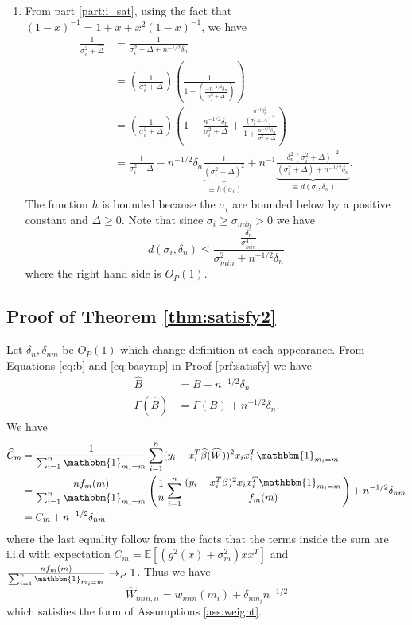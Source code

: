 \documentclass[ejs,ps,preprint]{imsart}
\numberwithin{equation}{section}
\theoremstyle{plain}
\newcommand{\E}{\mathbb{E}}
\newcommand{\ind}[1]{\mathbbm{1}_{#1}}
\def\E{\mathbb{E}}
\begin{document}
\begin{enumerate}
\item \label{part:ii_sat} From part \ref{part:i_sat}, using the fact that $(1-x)^{-1} = 1 + x + x^2(1-x)^{-1}$, we have
\begin{align*}
\frac{1}{\sigma_i^2 + \widehat{\Delta}} &= \frac{1}{\sigma_i^2 + \Delta + n^{-1/2}\delta_n}\\
&= \left(\frac{1}{\sigma_i^2 + \Delta}\right)\left(\frac{1}{1-\left(\frac{-n^{-1/2}\delta_n}{\sigma_i^2 + \Delta}\right)}\right)\\
&= \left(\frac{1}{\sigma_i^2 + \Delta}\right)\left(1 - \frac{n^{-1/2}\delta_n}{\sigma_i^2 + \Delta} + \frac{\frac{n^{-1}\delta_n^2}{(\sigma_i^2 + \Delta)^2}}{1+ \frac{n^{-1/2}\delta_n}{\sigma_i^2 + \Delta}}\right)\\
&= \frac{1}{\sigma_i^2 + \Delta} - n^{-1/2}\delta_n\underbrace{\frac{1}{(\sigma_i^2 + \Delta)^2}}_{\equiv h(\sigma_i)} + n^{-1}\underbrace{\frac{\delta_n^2(\sigma_i^2 + \Delta)^{-2}}{(\sigma_i^2 + \Delta) + n^{-1/2}\delta_n}}_{\equiv d(\sigma_i,\delta_n)}.
\end{align*}
The function $h$ is bounded because the $\sigma_i$ are bounded below by a positive constant and $\Delta \geq 0$. Note that since $\sigma_i \geq \sigma_{min} > 0$ we have
\begin{equation*}
d(\sigma_i,\delta_n) \leq \frac{\frac{\delta_n^2}{\sigma_{min}^4}}{\sigma_{min}^2 + n^{-1/2}\delta_n}
\end{equation*}
where the right hand side is $O_P(1)$.
\end{enumerate}


\subsection{Proof of Theorem \ref{thm:satisfy2}}
\label{prf:satisfy2}

Let $\delta_n, \delta_{nm}$ be $O_P(1)$ which change definition at each appearance. From Equations \eqref{eq:b} and \eqref{eq:basymp} in Proof \ref{prf:satisfy} we have
\begin{align*}
\widehat{B} &= B + n^{-1/2}\delta_n\\
\Gamma(\widehat{B}) &= \Gamma(B) + n^{-1/2}\delta_n.
\end{align*}
We have
\begin{align*}
\widehat{C}_m &= \frac{1}{\sum_{i=1}^n \ind{m_i=m}} \sum_{i=1}^n (y_i - x_i^T\widehat{\beta}(\widehat{W}))^2x_ix_i^T\ind{m_i=m}\\
&= \frac{nf_m(m)}{\sum_{i=1}^n \ind{m_i=m}} \left(\frac{1}{n} \sum_{i=1}^n \frac{(y_i - x_i^T\beta)^2x_ix_i^T\ind{m_i=m}}{f_m(m)}\right) + n^{-1/2}\delta_{nm}\\
&=C_m + n^{-1/2}\delta_{nm}
\end{align*}
where the last equality follow from the facts that the terms inside the sum are i.i.d with expectation $C_m = \E[(g^2(x) + \sigma_m^2)xx^T]$ and $\frac{nf_m(m)}{\sum_{i=1}^n \ind{m_i=m}} \rightarrow_P 1$. Thus we have
\begin{equation*}
\widehat{W}_{min,ii} = w_{min}(m_i) + \delta_{nm_i}n^{-1/2}
\end{equation*}
which satisfies the form of Assumptions \ref{ass:weight}.
\end{document}

